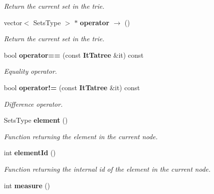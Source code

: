\begin{CompactItemize}
\begin{CompactList}\small\item\em Return the current set in the trie. \item\end{CompactList}\item 
vector$<$ Sets\-Type $>$ $\ast$ {\bf operator $\rightarrow$ } ()\label{class_it_tatree_c371c5e2578e4a595324a7b5e2f724fb}

\begin{CompactList}\small\item\em Return the current set in the trie. \item\end{CompactList}\item 
bool {\bf operator==} (const {\bf It\-Tatree} \&it) const \label{class_it_tatree_8621b3c89efe4ec59f8442cd1d623c43}

\begin{CompactList}\small\item\em Equality operator. \item\end{CompactList}\item 
bool {\bf operator!=} (const {\bf It\-Tatree} \&it) const \label{class_it_tatree_58dba2411bbbe6b9ac32111edba53670}

\begin{CompactList}\small\item\em Difference operator. \item\end{CompactList}\item 
Sets\-Type {\bf element} ()\label{class_it_tatree_38e5369627c5b457ecfd7326b12490a3}

\begin{CompactList}\small\item\em Function returning the element in the current node. \item\end{CompactList}\item 
int {\bf element\-Id} ()\label{class_it_tatree_a2ad1b09b123bba079d2427e283de61d}

\begin{CompactList}\small\item\em Function returning the internal id of the element in the current node. \item\end{CompactList}\item 
int {\bf measure} ()\label{class_it_tatree_223e7b585fe23711c0644660df522231}


\end{CompactItemize}
